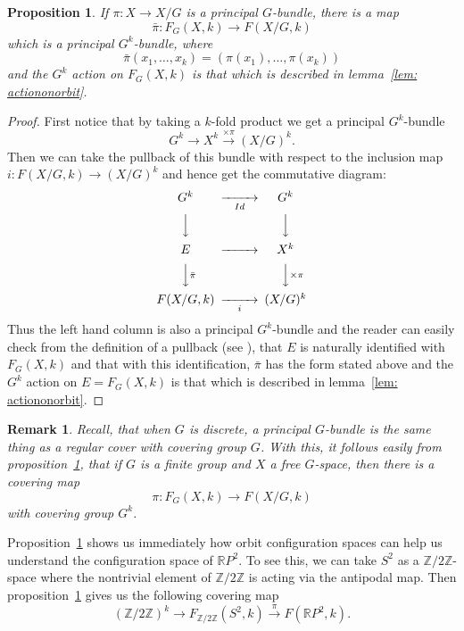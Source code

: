 \documentclass{amsart}
\newtheorem{prop}[thm]{Proposition}
\newtheorem{rem}[thm]{Remark}
\begin{document}
\begin{prop}
\label{pro: orbittonormalconfig}
If $\pi: X \rightarrow X/G$ is a principal $G$-bundle, 
there is a map
$$
\bar{\pi}: F_G(X,k) \rightarrow F(X/G,k)
$$
which is a principal $G^k$-bundle, where 
$$
\bar{\pi}(x_1,\dots,x_k)=
(\pi(x_1),\dots,\pi(x_k))
$$ 
and the $G^k$ action on $F_G(X,k)$
is that which is described in lemma~\ref{lem: actiononorbit}.
\end{prop}
\begin{proof}
First notice that by taking a $k$-fold product we get a principal
$G^k$-bundle 
$$
G^k \rightarrow X^k \overset{\times \pi}{\rightarrow} (X/G)^k.
$$
Then we can take the pullback of this bundle with respect to the inclusion map
$i: F(X/G,k) \rightarrow (X/G)^k$ and hence get the commutative diagram:
$$
\begin{CD}
G^k @>> Id > G^k \\
@VVV @VVV \\
E @>>> X^k \\
@VV \bar{\pi} V @VV \times \pi V \\
F(X/G,k) @>> i > (X/G)^k
\end{CD}
$$
Thus the left hand column is also a principal $G^k$-bundle and
the reader can easily check from the definition of a pullback
(see \cite{Bred}),
 that $E$ is naturally identified with  
$F_G(X,k)$ and that with this identification, $\bar{\pi}$
has the form stated above and the $G^k$ action on $E=F_G(X,k)$ is that
which is described in lemma~\ref{lem: actiononorbit}.
\end{proof}

\begin{rem}
Recall, that when $G$ is discrete, a principal $G$-bundle is the same thing
as a regular cover with covering group $G$.
With this, it follows easily from proposition~\ref{pro: orbittonormalconfig},
that if $G$ is a finite group and $X$ a free $G$-space, then there is a
covering map
$$
\pi: F_G(X,k) \rightarrow F(X/G,k)
$$
with covering group $G^k$. 
\end{rem}

Proposition~\ref{pro: orbittonormalconfig} shows us immediately how
orbit configuration spaces can help us understand the configuration
space of $\mathbb{R}P^2$. To see this, we can take 
$S^2$ as a $\mathbb{Z}/2\mathbb{Z}$-space where the nontrivial 
element 
of $\mathbb{Z}/2\mathbb{Z}$ is acting via the
antipodal map. Then proposition~\ref{pro: orbittonormalconfig}
gives us the following covering map
$$
(\mathbb{Z}/2\mathbb{Z})^k \rightarrow 
F_{\mathbb{Z}/2\mathbb{Z}}(S^2,k) \overset{\pi}{\rightarrow} 
F(\mathbb{R}P^2,k).
$$
\end{document}
